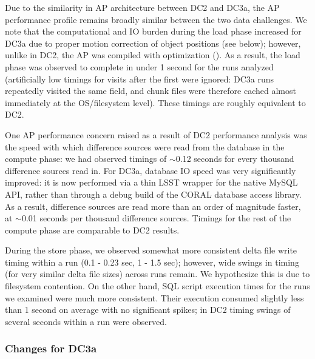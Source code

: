 Due to the similarity in AP architecture between DC2 and DC3a, the AP
performance profile remains broadly similar between the two data challenges.
We note that the computational and IO burden during the load phase increased
for DC3a due to proper motion correction of object positions (see below);
however, unlike in DC2, the AP was compiled with optimization ().
As a result, the load phase was observed to complete in under
1 second for the runs analyzed (artificially low timings for visits after the
first were ignored: DC3a runs repeatedly visited the same field, and chunk
files were therefore cached almost immediately at the OS/filesystem level).
These timings are roughly equivalent to DC2.

One AP performance concern raised as a result of DC2 performance analysis was
the speed with which difference sources were read from the database in the
compute phase:  we had observed timings of \ensuremath{\sim}0.12 seconds for
every thousand difference sources read in. For DC3a, database IO speed was
very significantly improved: it is now performed via a thin LSST wrapper for
the native MySQL API, rather than through a debug build of the CORAL database
access library. As a result, difference sources are read more than an order of
magnitude faster, at \ensuremath{\sim}0.01 seconds per thousand difference
sources. Timings for the rest of the compute phase are comparable to DC2
results.

During the store phase, we observed somewhat more consistent delta file write
timing within a run (0.1 - 0.23 sec, 1 - 1.5 sec); however, wide swings in
timing (for very similar delta file sizes) across runs remain. We hypothesize
this is due to filesystem contention. On the other hand, SQL script execution
times for the runs we examined were much more consistent. Their execution
consumed slightly less than 1 second on average with no significant spikes; in
DC2 timing swings of several seconds within a run were observed.

\subsubsection{Changes for DC3a}

